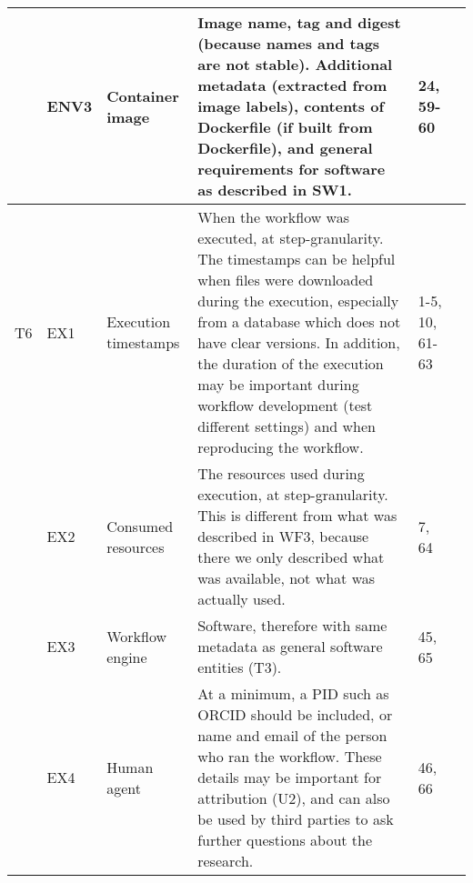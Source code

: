 \begin{table*}
\begin{tabularx}{\linewidth}{p{0.1in}p{0.3in}p{1.3in}Lp{0.45in}p{0.3in}}
    & ENV3  & Container image                   & Image name, tag and digest (because names and tags are not stable). Additional metadata (extracted from image labels), contents of Dockerfile (if built from Dockerfile), and general requirements for software as described in SW1.                & 24, 59-60 &  \\
\midrule
T6  & EX1   & Execution timestamps              & When the workflow was executed, at step-granularity. The timestamps can be helpful when files were downloaded during the execution, especially from a database which does not have clear versions. In addition, the duration of the execution may be important during workflow development (test different settings) and when reproducing the workflow. & 1-5, 10, 61-63 &   \\
    & EX2   & Consumed resources             & The resources used during execution, at step-granularity. This is different from what was described in WF3, because there we only described what was available, not what was actually used.  & 7, 64  &  \\
    & EX3   & Workflow engine                   & Software, therefore with same metadata as general software entities (T3).             & 45, 65 & \\
    & EX4   & Human agent                       & At a minimum, a PID such as ORCID should be included, or name and email of the person who ran the workflow. These details may be important for attribution (U2), and can also be used by third parties to ask further questions about the research.                 & 46, 66 &  \\
\bottomrule
\end{tabularx}


\end{table*}
